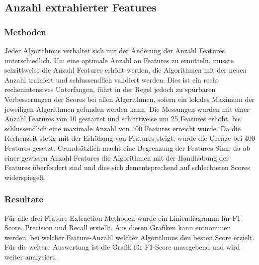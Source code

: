 \subsection{Anzahl extrahierter Features}
\subsubsection{Methoden}
Jeder Algorithmus verhaltet sich mit der Änderung der Anzahl Features unterschiedlich.
Um eine optimale Anzahl an Features zu ermitteln, musste schrittweise die Anzahl Features erhöht werden, die Algorithmen mit der neuen Anzahl trainiert und schlussendlich validiert werden.
Dies ist ein recht rechenintensives Unterfangen, führt in der Regel jedoch zu spürbaren Verbesserungen der Scores bei allen Algorithmen, sofern ein lokales Maximum der jeweiligen Algorithmen gefunden werden kann.
Die Messungen wurden mit einer Anzahl Features von 10 gestartet und schrittweise um 25 Features erhöht, bis schlussendlich eine maximale Anzahl von 400 Features erreicht wurde.
Da die Rechenzeit stetig mit der Erhöhung von Features steigt, wurde die Grenze bei 400 Features gesetzt.
Grundsätzlich macht eine Begrenzung der Features Sinn, da ab einer gewissen Anzahl Features die Algorithmen mit der Handhabung der Features überfordert sind und dies sich dementsprechend auf schlechteren Scores widerspiegelt.
\subsubsection{Resultate}
Für alle drei Feature-Extraction Methoden wurde ein Liniendiagramm für F1-Score, Precision und Recall erstellt.
Aus diesen Grafiken kann entnommen werden, bei welcher Feature-Anzahl welcher Algorithmus den besten Score erzielt.
Für die weitere Auswertung ist die Grafik für F1-Score massgebend und wird weiter analysiert.
